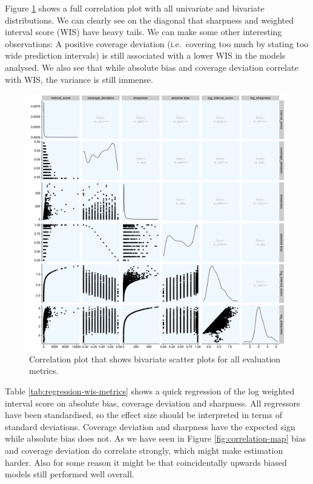 \documentclass[
]{book}
\begin{document}
Figure \ref{fig:correlation-plot} shows a full correlation plot with all univariate and bivariate distributions. We can clearly see on the diagonal that sharpness and weighted interval score (WIS) have heavy tails. We can make some other interesting observations: A positive coverage deviation (i.e.~covering too much by stating too wide prediction intervals) is still associated with a lower WIS in the models analysed. We also see that while absolute bias and coverage deviation correlate with WIS, the variance is still immense.

\begin{figure}

{\centering \includegraphics[width=1\linewidth]{../visualisation/chapter-5-results/corr-plot} 

}

\caption{Correlation plot that shows bivariate scatter plots for all evaluation metrics.}\label{fig:correlation-plot}
\end{figure}

Table \ref{tab:regression-wis-metrics} shows a quick regression of the log weighted interval score on absolute bias, coverage deviation and sharpness. All regressors have been standardised, so the effect size should be interpreted in terms of standard deviations. Coverage deviation and sharpness have the expected sign while absolute bias does not. As we have seen in Figure \ref{fig:correlation-map} bias and coverage deviation do correlate strongly, which might make estimation harder. Also for some reason it might be that coincidentally upwards biased models still performed well overall.
\end{document}
